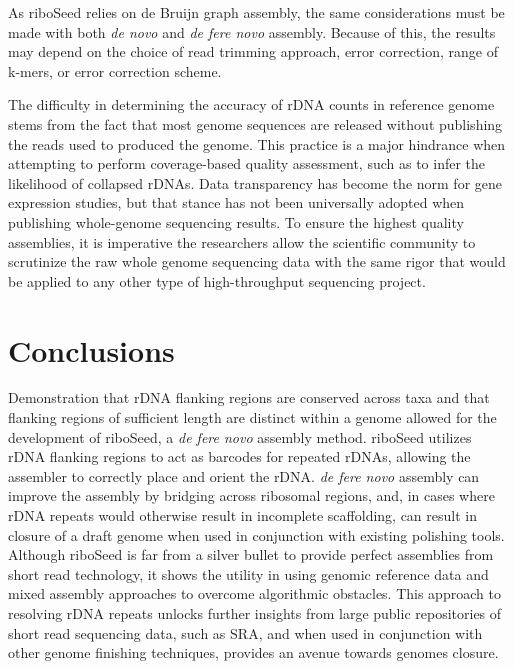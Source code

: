 \documentclass[10pt]{article}
\begin{document}
\begin{linenumbers}
As riboSeed relies on de Bruijn graph assembly, the same considerations must be made with both \textit{de novo} and \textit{de fere novo} assembly. Because of this, the results may depend on the choice of read trimming approach, error correction, range of k-mers, or error correction scheme.

The difficulty in determining the accuracy of rDNA counts in reference genome stems from the fact that most genome sequences are released without publishing the reads used to produced the genome. This practice is a major hindrance when attempting to perform coverage-based quality assessment, such as to infer the likelihood of collapsed rDNAs. Data transparency has become the norm for gene expression studies, but that stance has not been universally adopted when publishing whole-genome sequencing results. To ensure the highest quality assemblies, it is imperative the researchers allow the scientific community to scrutinize the raw whole genome sequencing data with the same rigor that would be applied to any other type of high-throughput sequencing project.



\section*{Conclusions}
Demonstration that rDNA flanking regions are conserved across taxa and that flanking regions of sufficient length are distinct within a genome allowed for the development of riboSeed, a \textit{de fere novo} assembly method. riboSeed  utilizes rDNA flanking regions to act as barcodes for repeated rDNAs, allowing the assembler to correctly place and orient the rDNA. \textit{de fere novo} assembly can improve the assembly by bridging across ribosomal regions, and, in cases where rDNA repeats would otherwise result in incomplete scaffolding, can result in closure of a draft genome when used in conjunction with existing polishing tools. Although riboSeed is far from a silver bullet to provide perfect assemblies from short read technology, it shows the utility in using genomic reference data and mixed assembly approaches to overcome algorithmic obstacles. This approach to resolving rDNA repeats unlocks further insights from large public repositories of short read sequencing data, such as SRA, and when used in conjunction with other genome finishing techniques, provides an avenue towards genomes closure.

\end{linenumbers}
\baselineskip13pt
\end{document}
